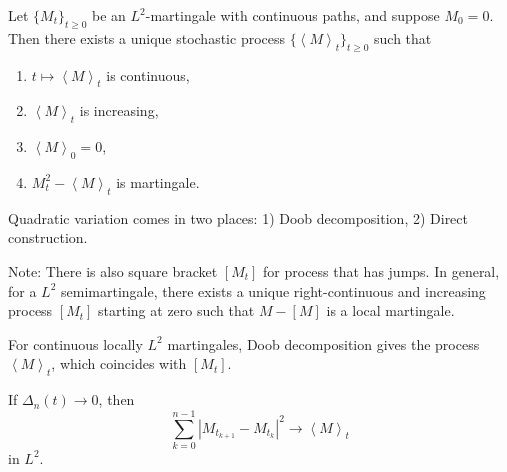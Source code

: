 \begin{theorem}
	Let $\{M_t\} _{t \ge 0}$ be an $L^2$-martingale with continuous paths, and suppose $M_0 = 0$. Then there exists a unique stochastic process $\{\left\langle M \right\rangle _t\} _{t \ge 0}$ such that
	\begin{enumerate}
		\item  $t \mapsto \left\langle M \right\rangle _t$ is continuous,
		\item $\left\langle M \right\rangle _t$ is increasing,
		\item $\left\langle M \right\rangle _0 = 0$,
		\item $M_t^2 - \left\langle M \right\rangle _t$ is martingale.
	\end{enumerate}
\end{theorem}

\begin{remark}
Quadratic variation comes in two places: 1) Doob decomposition, 2) Direct construction.

Note: There is also square bracket $[M_t]$ for process that has jumps. In general, for a $L^2$ semimartingale, there exists a unique right-continuous and increasing process $\left[ M_t \right] $ starting at zero such that $M - [M]$ is a local martingale.

For continuous locally $L^2$ martingales, Doob decomposition gives the process $\left\langle M \right\rangle _t$, which coincides with $[M_t]$.
\end{remark}

\begin{fact}
	If $\Delta_n(t) \to 0$, then
	\[
		\sum_{k = 0}^{n - 1} \left| M_{t_{k+1}} - M_{t_k} \right| ^2 \to \left\langle M \right\rangle _t
	\] 
	in $L^2$.
\end{fact}




